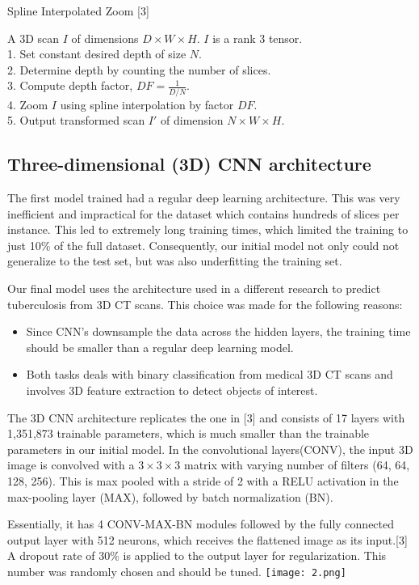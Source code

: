 \documentclass[conference]{IEEEtran}
\begin{document}
\begin{algorithm}
\caption{Spline Interpolated Zoom [3]}\label{alg:cap}
\begin{algorithmic}
\Require A 3D scan $I$ of dimensions $D \times W \times H$.
\Ensure $I$ is a rank 3 tensor.\\
1. Set constant desired depth of size $N$.\\
2. Determine depth by counting the number of slices.\\
3. Compute depth factor, $DF = \frac{1}{D/N}$.\\
4. Zoom $I$ using spline interpolation by factor $DF$.\\
5. Output transformed scan $I'$ of dimension $N \times W \times H$.\\
\end{algorithmic}
\end{algorithm}


\subsection{\textbf{Three-dimensional (3D) CNN architecture}}
\par
The first model trained had a regular deep learning architecture. This was very inefficient and impractical for the dataset which contains hundreds of slices per instance. This led to extremely long training times, which limited the training to just 10\% of the full dataset. Consequently, our initial model not only could not generalize to the test set, but was also underfitting the training set.
\par
Our final model uses the architecture used in a different research to predict tuberculosis from 3D CT scans. This choice was made for the following reasons: 
\begin{itemize}
    \item Since CNN's downsample the data across the hidden layers, the training time should be smaller than a regular deep learning model. 
    \item Both tasks deals with binary classification from medical 3D CT scans and involves 3D feature extraction to detect objects of interest.
\end{itemize}
\par
The 3D CNN architecture replicates the one in [3] and consists of 17 layers with 1,351,873
trainable parameters, which is much smaller than the trainable parameters in our initial model. In the convolutional layers(CONV), the input 3D image is convolved with a $3 \times 3 \times 3$ matrix with varying number of filters (64, 64, 128, 256). This is max pooled with a stride of 2 with a RELU activation in the max-pooling layer (MAX), followed by batch normalization (BN).
\par
Essentially, it has 4 CONV-MAX-BN modules followed by the fully connected output layer with 512 neurons, which receives the flattened image as its input.[3] A dropout rate of 30\% is applied to the output layer for regularization. This number was randomly chosen and should be tuned.
\texttt{[image: 2.png]}
\end{document}
